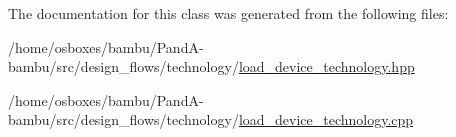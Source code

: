 The documentation for this class was generated from the following files\+:\begin{DoxyCompactItemize}
\item 
/home/osboxes/bambu/\+Pand\+A-\/bambu/src/design\+\_\+flows/technology/\hyperlink{load__device__technology_8hpp}{load\+\_\+device\+\_\+technology.\+hpp}\item 
/home/osboxes/bambu/\+Pand\+A-\/bambu/src/design\+\_\+flows/technology/\hyperlink{load__device__technology_8cpp}{load\+\_\+device\+\_\+technology.\+cpp}\end{DoxyCompactItemize}
